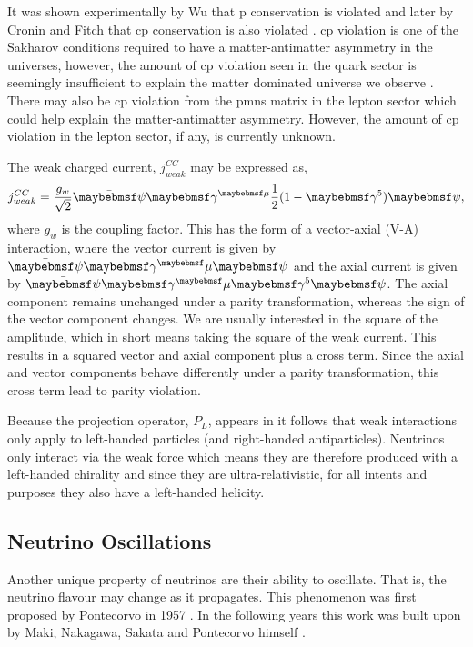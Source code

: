 It was shown experimentally by Wu that \gls{p} conservation is violated and later by Cronin and Fitch that \gls{cp} conservation is also violated \cite{Wu_experiment}\cite{Cronin_and_Fitch_experiment}. \gls{cp} violation is one of the Sakharov conditions required to have a matter-antimatter asymmetry in the universes, however, the amount of \gls{cp} violation seen in the quark sector is seemingly insufficient to explain the matter dominated universe we observe \cite{Sakharov_conditions}. There may also be \gls{cp} violation from the \gls{pmns} matrix in the lepton sector which could help explain the matter-antimatter asymmetry. However, the amount of \gls{cp} violation in the lepton sector, if any, is currently unknown. 

The weak charged current, $j^{CC}_{weak}$ may be expressed as, 
\begin{equation}\label{eqn:weak current}
    j^{CC}_{weak} = \frac{g_w}{\sqrt{2}}\Bar{\psi}\gamma^{\mu}\frac{1}{2}(1-\gamma^5)\psi,
\end{equation}
where $g_w$ is the coupling factor.
This has the form of a vector-axial (V-A) interaction, where the vector current is given by $\Bar{\psi}\gamma^\mu\psi$ and the axial current is given by $\Bar{\psi}\gamma^\mu\gamma^5\psi$. The axial component remains unchanged under a parity transformation, whereas the sign of the vector component changes. We are usually interested in the square of the amplitude, which in short means taking the square of the weak current. This results in a squared vector and axial component plus a cross term. Since the axial and vector components behave differently under a parity transformation, this cross term lead to parity violation. 

Because the projection operator, $P_L$, appears in  it follows that weak interactions only apply to left-handed particles (and right-handed antiparticles). Neutrinos only interact via the weak force which means they are therefore produced with a left-handed chirality and since they are ultra-relativistic, for all intents and purposes they also have a left-handed helicity. 

\subsection{Neutrino Oscillations}\label{subsec:Neutrino Oscillations}
Another unique property of neutrinos are their ability to oscillate. That is, the neutrino flavour may change as it propagates. This phenomenon was first proposed by Pontecorvo in 1957 \cite{Pontecorvo}. In the following years this work was built upon by Maki, Nakagawa, Sakata and Pontecorvo himself \cite{MNS_oscillations}. 

